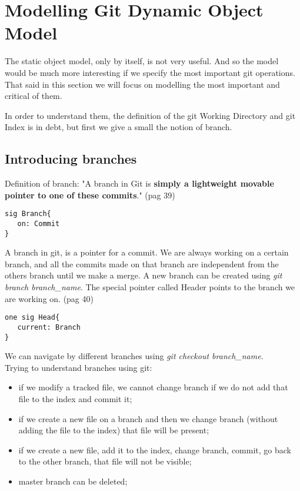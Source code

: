 \section {Modelling Git Dynamic Object Model}
The static object model, only by itself, 
is not very useful. And so
the model would be much more interesting if we specify 
the most important git operations. That said in this
section we will focus on modelling the most important
and critical of them. \par

In order to understand them, the definition
of the git Working Directory and git Index is in debt,
but first we give a small the notion of branch.

\subsection{Introducing branches}
Definition of branch: "A branch in Git is {\bf simply a 
lightweight movable pointer to one of these commits}." \cite{progit} 
(pag 39)\\

\begin{lstlisting}
sig Branch{
   on: Commit
}
\end{lstlisting}

A branch in git, is a pointer for a commit. We are always 
working on a certain branch, and all the commits made on 
that branch are independent from the others branch until we 
make a merge. A new branch can be created using 
\emph{git branch branch\_name}. The special pointer called Header 
points to the branch we are working on. \cite{progit} (pag 40)

\begin{lstlisting}
one sig Head{
   current: Branch
}
\end{lstlisting}

We can navigate by different branches using 
\emph{git checkout branch\_name}.\\


Trying to understand branches using git:
\begin{itemize}
   \item if we modify a tracked file, we cannot change branch if we do not add that file to the index and commit it;
   \item if we create a new file on a branch and then we change branch (without adding the file to the index) that file will be present;
   \item if we create a new file, add it to the index, change branch, commit, go back to the other branch, that file will not be visible;
   \item master branch can be deleted;
\end{itemize}

